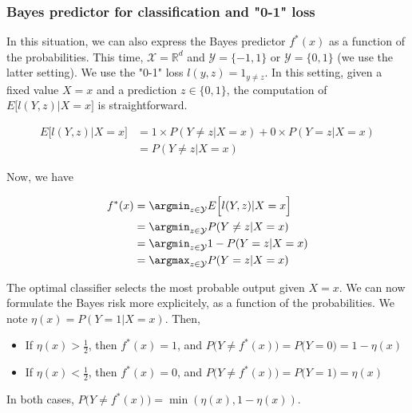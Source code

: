 \documentclass[
10pt, %
a4paper, %
oneside, %
headinclude,footinclude, %
BCOR5mm, %
]{scrartcl}
\begin{document}
\subsubsection{\large\color{Periwinkle}Bayes predictor for classification and "0-1" loss}

In this situation, we can also express the Bayes predictor $f^*(x)$ as a
function of the probabilities. This time, $ \mathcal{X} = \mathbb{R}^d$ and $
\mathcal{Y}  = \{-1, 1\}$ or $ \mathcal{Y}  = \{0, 1\}$ (we use the latter
setting). We use the "0-1" loss $l(y,z) = 1_{y\neq z}$. In this setting, given a fixed value $X=x$ and a prediction $z\in \{0, 1\}$,
the computation of $E\Big[l(Y,z)|X=x\Big]$ is
straightforward.

\begin{equation}
    \begin{aligned}
        \label{eq:}
        E\Big[l(Y,z)|X=x\Big] &= 1 \times P(Y\neq z|X=x)+0\times P(Y=z|X=x)\\
        &=  P(Y\neq z|X=x)
    \end{aligned}
\end{equation}


Now, we have

    \begin{equation}
        \begin{aligned}
            \label{eq:}
	    f^*(x)&= \argmin_{z\in \mathcal{Y} }E\Big[l(Y,z)|X=x\Big]\\
	    &= \argmin_{z\in \mathcal{Y} }P(Y\neq z|X=x)\\
	    &= \argmin_{z\in \mathcal{Y} }1-P(Y=z|X=x)\\
	    &= \argmax_{z\in \mathcal{Y} }P(Y=z|X=x)
        \end{aligned}
    \end{equation}

    The optimal classifier selects the most probable output given $X=x$. We can
    now formulate the Bayes risk more explicitely, as a function of the
    probabilities. We note $\eta(x) = P(Y=1|X=x)$. Then, 
    \begin{itemize}
        \item If $ \eta(x)> \frac{1}{2} $, then $f^*(x)=1$, and $P\big( Y\neq f^*(x)\big) =   P\big( Y=0\big)=1-\eta(x)$
	\item If $ \eta(x)< \frac{1}{2} $, then $f^*(x)=0$, and $P\big( Y\neq f^*(x)\big) =   P\big( Y=1\big)=\eta(x)$
    \end{itemize}

    In both cases, $P\big( Y\neq f^*(x)\big)= \min(\eta(x), 1-\eta(x))$.
    \\
\end{document}
